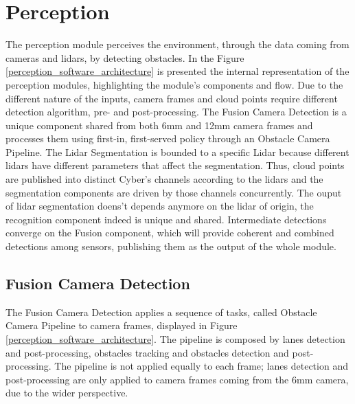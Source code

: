 \documentclass[conference]{IEEEtran}
\begin{document}
%

\section{Perception}
The perception module perceives the environment, through the data coming from cameras and lidars, by detecting obstacles.
In the Figure \ref{perception_software_architecture} is presented the internal representation of the perception modules, highlighting the module's components and flow.
Due to the different nature of the inputs, camera frames and cloud points require different detection algorithm, pre- and post-processing.
The Fusion Camera Detection is a unique component shared from both 6mm and 12mm camera frames and processes them using first-in, first-served policy through an Obstacle Camera Pipeline.
The Lidar Segmentation is bounded to a specific Lidar because different lidars have different parameters that affect the segmentation.
Thus, cloud points are published into distinct Cyber's channels according to the lidars and the segmentation components are driven by those channels concurrently.
The ouput of lidar segmentation doens't depends anymore on the lidar of origin, the recognition component indeed is unique and shared.
Intermediate detections converge on the Fusion component, which will provide coherent and combined detections among sensors, publishing them as the output of the whole module.

\subsection{Fusion Camera Detection}

The Fusion Camera Detection applies a sequence of tasks, called Obstacle Camera Pipeline to camera frames, displayed in Figure \ref{perception_software_architecture}.
The pipeline is composed by lanes detection and post-processing, obstacles tracking and obstacles detection and post-processing.
The pipeline is not applied equally to each frame; lanes detection and post-processing are only applied to camera frames coming from the 6mm camera, due to the wider perspective.
\end{document}

